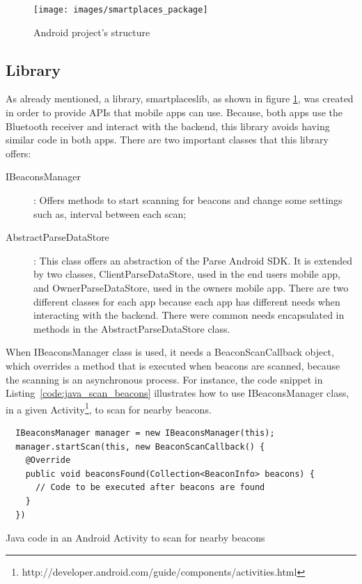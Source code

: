 \begin{figure}[!ht]
  \centering
    \texttt{[image: images/smartplaces\_package]}
    \caption[Android project's structure]{Android project's structure}
    \label{fig:smartplaces_package}
\end{figure}

\subsection{Library}
\label{sub:implementation_library}
As already mentioned, a library, smartplaceslib, as shown in figure \ref{fig:smartplaces_package}, was created in order to provide \glspl{API} that mobile apps can
use. Because, both apps use the Bluetooth receiver and interact with the backend, this library avoids having similar code in both apps. There are two important classes that this library offers:
\begin{description}
  \item[IBeaconsManager]: Offers methods to start scanning for beacons and change some settings such as, interval between each scan;
  \item[AbstractParseDataStore]: This class offers an abstraction of the Parse Android \gls{SDK}. It is extended by two classes, ClientParseDataStore, used in the end users mobile app, and OwnerParseDataStore, used in the owners mobile app. There are two different classes for each app because each app has different needs when interacting with the backend. There were common needs encapsulated in methods in the AbstractParseDataStore class.
\end{description}

When IBeaconsManager class is used, it needs a BeaconScanCallback object, which overrides a method that is executed when beacons are scanned, because the scanning is an asynchronous process.
For instance, the code snippet in Listing~\ref{code:java_scan_beacons} illustrates how to use IBeaconsManager class, in a given
Activity\footnote{http://developer.android.com/guide/components/activities.html}, to scan for nearby beacons.

\begin{listing}[H]
  \begin{verbatim}
  IBeaconsManager manager = new IBeaconsManager(this);
  manager.startScan(this, new BeaconScanCallback() {
    @Override
    public void beaconsFound(Collection<BeaconInfo> beacons) {
      // Code to be executed after beacons are found
    }
  })
  \end{verbatim}
  \caption[Java code for beacon scanning]{Java code in an Android Activity to scan for nearby beacons}
  \label{code:java_scan_beacons}
\end{listing}

